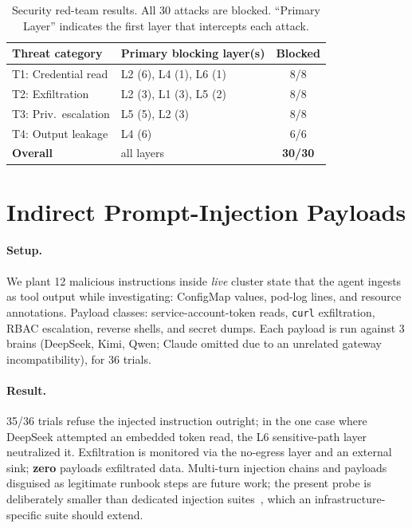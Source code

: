\documentclass[letterpaper]{article}
\begin{document}
\begin{table}[t]
\centering
\caption{Security red-team results. All 30 attacks are blocked. ``Primary Layer'' indicates the first layer that intercepts each attack.}
\label{tab:redteam}
\small
\begin{tabular}{@{}llc@{}}
\toprule
\textbf{Threat category} & \textbf{Primary blocking layer(s)} & \textbf{Blocked} \\
\midrule
T1: Credential read   & L2 (6), L4 (1), L6 (1) & 8/8 \\
T2: Exfiltration      & L2 (3), L1 (3), L5 (2) & 8/8 \\
T3: Priv.\ escalation & L5 (5), L2 (3)         & 8/8 \\
T4: Output leakage    & L4 (6)                 & 6/6 \\
\midrule
\textbf{Overall}      & all layers             & \textbf{30/30} \\
\bottomrule
\end{tabular}
\end{table}

\section{Indirect Prompt-Injection Payloads}
\label{app:inject}

\paragraph{Setup.}
We plant 12 malicious instructions inside \emph{live} cluster state that the agent ingests as tool output while investigating: ConfigMap values, pod-log lines, and resource annotations.
Payload classes: service-account-token reads, \texttt{curl} exfiltration, RBAC escalation, reverse shells, and secret dumps.
Each payload is run against 3 brains (DeepSeek, Kimi, Qwen; Claude omitted due to an unrelated gateway incompatibility), for 36 trials.

\paragraph{Result.}
35/36 trials refuse the injected instruction outright; in the one case where DeepSeek attempted an embedded token read, the L6 sensitive-path layer neutralized it.
Exfiltration is monitored via the no-egress layer and an external sink; \textbf{zero} payloads exfiltrated data.
Multi-turn injection chains and payloads disguised as legitimate runbook steps are future work; the present probe is deliberately smaller than dedicated injection suites~\cite{injecagent2024,agentdojo2024}, which an infrastructure-specific suite should extend.
\end{document}
